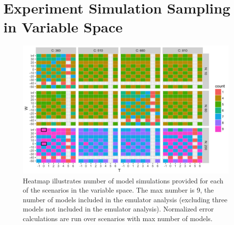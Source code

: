\documentclass[10pt]{article}
\begin{document}
\\

\vspace{3mm}




\clearpage

\renewcommand{\thefigure}{S\arabic{figure}}


\section{Experiment Simulation Sampling in Variable Space}
\begin{figure}[h!]
\centering
\includegraphics[width=\textwidth]{s_how_many_simulations.png}
\caption{
Heatmap illustrates number of model simulations provided for each of the scenarios in the variable space. 
The max number is 9, the number of models included in the emulator analysis (excluding three models not included in the emulator analysis). 
Normalized error calculations are run over scenarios with max number of models.
}
\label{fig:numbersims}
\end{figure}

\clearpage
\end{document}
